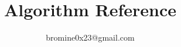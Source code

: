 \documentclass[fancyhdr,hyperref,a4paper,UTF8,leqno]{ctexbook}
\begin{document}
\title{Algorithm Reference}
\author{bromine0x23@gmail.com}
\maketitle
\tableofcontents








\end{document}
